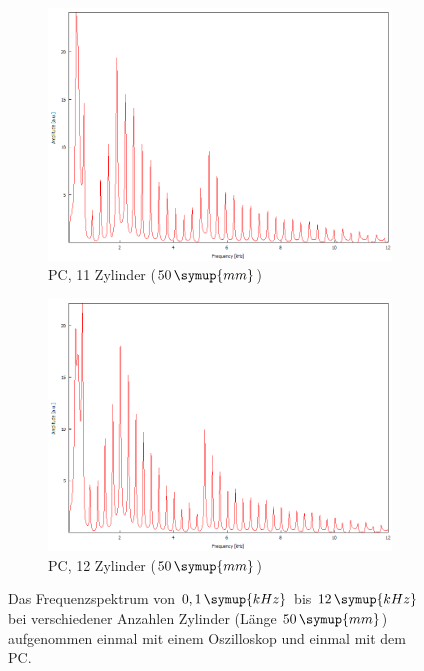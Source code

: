 \begin{figure}
\begin{subfigure}[b]{0.3\textwidth}
        \includegraphics[width=\textwidth]{data/1_2zylinder50mmPC/11.png}
        \caption{PC, 11 Zylinder ($50 \, \symup{mm}$)}
    \end{subfigure}
    \hfill
    \begin{subfigure}[b]{0.3\textwidth}
        \centering
        \includegraphics[width=\textwidth]{data/1_2zylinder50mmPC/12.png}
        \caption{PC, 12 Zylinder ($50 \, \symup{mm}$)}
    \end{subfigure}
       \caption{Das Frequenzspektrum von $0,1 \, \symup{kHz}$ bis $12 \, \symup{kHz}$ bei verschiedener Anzahlen Zylinder (Länge $50 \, \symup{mm}$) aufgenommen einmal mit einem Oszilloskop und einmal mit dem PC.}
       \label{fig:anhang3}
\end{figure}


